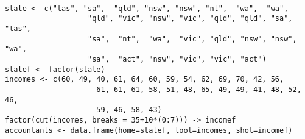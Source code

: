 \begin{verbatim}

state <- c("tas", "sa",  "qld", "nsw", "nsw", "nt",  "wa",  "wa",
                   "qld", "vic", "nsw", "vic", "qld", "qld", "sa",  "tas",
                   "sa",  "nt",  "wa",  "vic", "qld", "nsw", "nsw", "wa",
                   "sa",  "act", "nsw", "vic", "vic", "act")
statef <- factor(state)
incomes <- c(60, 49, 40, 61, 64, 60, 59, 54, 62, 69, 70, 42, 56,
                     61, 61, 61, 58, 51, 48, 65, 49, 49, 41, 48, 52, 46,
                     59, 46, 58, 43)
factor(cut(incomes, breaks = 35+10*(0:7))) -> incomef
accountants <- data.frame(home=statef, loot=incomes, shot=incomef) 


\end{verbatim}